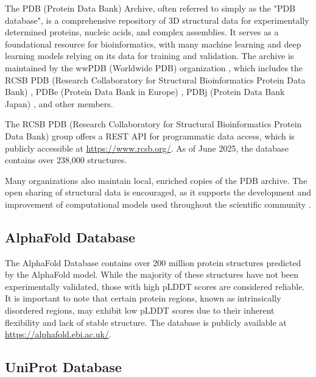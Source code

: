 The PDB (Protein Data Bank) Archive, often referred to simply as the "PDB database", is a comprehensive repository of 3D structural data for experimentally determined proteins, nucleic acids, and complex assemblies. It serves as a foundational resource for bioinformatics, with many machine learning and deep learning models relying on its data for training and validation. The archive is maintained by the wwPDB (Worldwide PDB) organization \cite{berman2003announcing}, which includes the RCSB PDB (Research Collaboratory for Structural Bioinformatics Protein Data Bank) \cite{berman2000protein}, PDBe (Protein Data Bank in Europe) \cite{velankar2010pdbe}, PDBj (Protein Data Bank Japan) \cite{kinjo2012protein}, and other members. 

The RCSB PDB (Research Collaboratory for Structural Bioinformatics Protein Data Bank) group offers a REST API for programmatic data access, which is publicly accessible at \url{https://www.rcsb.org/}. As of June 2025, the database contains over 238,000 structures.

Many organizations also maintain local, enriched copies of the PDB archive. The open sharing of structural data is encouraged, as it supports the development and improvement of computational models used throughout the scientific community \cite{callaway2025alphafold}.

\subsection{AlphaFold Database}
\label{sec:alphafold-db}

The AlphaFold Database \cite{varadi2024alphafold} contains over 200 million protein structures predicted by the AlphaFold model. While the majority of these structures have not been experimentally validated, those with high pLDDT scores are considered reliable. It is important to note that certain protein regions, known as intrinsically disordered regions, may exhibit low pLDDT scores due to their inherent flexibility and lack of stable structure. The database is publicly available at \url{https://alphafold.ebi.ac.uk/}.

\subsection{UniProt Database}
\label{sec:uniprot-db}


